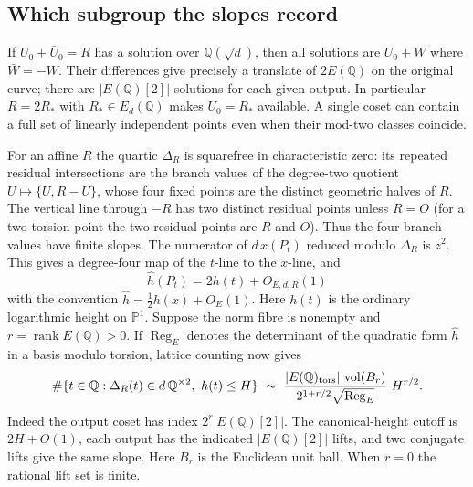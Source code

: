 \documentclass[11pt]{article}
\begin{document}
\subsection{Which subgroup the slopes record}
If $U_0+\bar U_0=R$ has a solution over $\mathbb Q(\sqrt d)$,
then all solutions are $U_0+W$ where $\bar W=-W$.
Their differences give precisely a translate of $2E(\mathbb Q)$ on
the original curve; there are $|E(\mathbb Q)[2]|$ solutions for each
given output. In particular $R=2R_*$ with $R_*\in E_d(\mathbb Q)$
makes $U_0=R_*$ available. A single coset can contain a full set of
linearly independent points even when their mod-two classes coincide.

For an affine $R$ the quartic $\Delta_R$ is squarefree in
characteristic zero: its repeated residual intersections are the
branch values of the degree-two quotient $U\mapsto\{U,R-U\}$, whose
four fixed points are the distinct geometric halves of $R$.
The vertical line through $-R$ has two distinct residual points
unless $R=O$ (for a two-torsion point the two residual points
are $R$ and $O$). Thus the four branch values have finite slopes.
The numerator of $d\,x(P_t)$ reduced modulo $\Delta_R$
is $z^2$. This gives a degree-four map of the $t$-line to the
$x$-line, and
\[
                  \hat h(P_t)=2h(t)+O_{E,d,R}(1)
\]
with the convention $\hat h=\tfrac12h(x)+O_E(1)$.
Here $h(t)$ is the ordinary logarithmic height on $\mathbb P^1$.
Suppose the norm fibre is nonempty and $r=\operatorname{rank}E(\mathbb Q)>0$.
If $\operatorname{Reg}_E$ denotes the determinant of the quadratic
form $\hat h$ in a basis modulo torsion, lattice counting now gives
\[
 \#\{t\in\mathbb Q:\Delta_R(t)\in d\,\mathbb Q^{\times2},\
                            h(t)\le H\}
 \ \sim\
 \frac{|E(\mathbb Q)_{\rm tors}|\,\operatorname{vol}(B_r)}
      {2^{1+r/2}\sqrt{\operatorname{Reg}_E}}\ H^{r/2}.
\]
Indeed the output coset has index
$2^r|E(\mathbb Q)[2]|$. The canonical-height cutoff is $2H+O(1)$,
each output has the indicated $|E(\mathbb Q)[2]|$ lifts, and two
conjugate lifts give the same slope. Here $B_r$ is the Euclidean
unit ball. When $r=0$ the rational lift set is finite.
\end{document}
